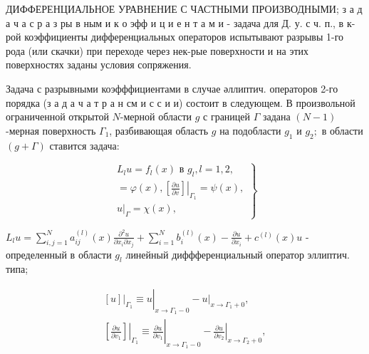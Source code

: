 \documentclass[10pt]{article}
\begin{document}
ДИФФЕРЕНЦИАЛЬНОЕ УРАВНЕНИЕ С ЧАСТНЫМИ ПРОИЗВОДНЫМИ; з а д а ч а с р а з ры в ным и к о эфф и ц и е н т а м и - задача для Д. у. с ч. п., в к-рой коэффициенты дифференциальных операторов испытывают разрывы 1-го рода (или скачки) при переходе через нек-рые поверхности и на этих поверхностях заданы условия сопряжения.



Задача с разрывными коэфффициентами в случае әллиптич. операторов 2-го порядка (з а д а ч а т р а н см и с с и и) состоит в следующем. В произвольной ограниченной открытой $N$-мерной области $g$ с границей $\Gamma$ задана $(N-1)$-мерная поверхность $\Gamma_{1}$, разбивающая область $g$ на подобласти $g_{1}$ и $g_{2} ;$ в области $(g+\Gamma)$ ставится задача:



\[

\left.\begin{array}{c}

L_{l} u=f_{l}(x) \text { в } g_{l}, l=1,2, \\

=\varphi(x),\left.\left[\frac{\partial u}{\partial v}\right]\right|_{\Gamma_{1}}=\psi(x), \\

\left.u\right|_{\Gamma}=\chi(x),

\end{array}\right\}

\]



$L_{l} u=\sum_{i, j=1}^{N} a_{i j}^{(l)}(x) \frac{\partial^{2} u}{\partial x_{i} \partial x_{j}}+\sum_{i=1}^{N} b_{i}^{(l)}(x)-\frac{\partial u}{\partial x_{i}}+c^{(l)}(x) u$ - определенный в области $g_{l}$ линейный диффференциальный оператор эллиптич. типа;



\[

\begin{gathered}

{\left.\left.[u]\right|_{\Gamma_{1}} \equiv u\right|_{x \rightarrow \Gamma_{1}-0}-\left.u\right|_{x \rightarrow \Gamma_{1}+0},} \\

{\left.\left.\left[\frac{\partial u}{\partial v_{1}}\right]\right|_{\Gamma_{1}} \equiv \frac{\partial u}{\partial v_{1}}\right|_{x \rightarrow \Gamma_{1}-0}-\left.\frac{\partial u}{\partial v_{2}}\right|_{x \rightarrow \Gamma_{2}+0},}

\end{gathered}

\]
\end{document}

